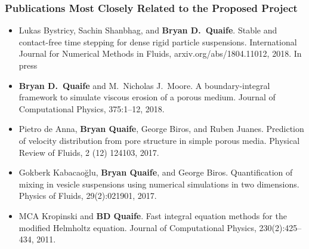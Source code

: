 \documentclass[11pt]{article}
\begin{document}
\subsubsection{Publications Most Closely Related to the Proposed
Project}
\begin{itemize}[noitemsep,topsep=0pt,parsep=0pt,partopsep=0pt] 
  \item Lukas Bystricy, Sachin Shanbhag, and {\bf Bryan D.~Quaife}.
    Stable and contact-free time stepping for dense rigid particle
    suspensions.  International Journal for Numerical Methods in Fluids,
    arxiv.org/abs/1804.11012, 2018.  In press

\item {\bf Bryan D.~Quaife} and M.~Nicholas J.~Moore.  A
  boundary-integral framework to simulate viscous erosion of a porous
  medium.  Journal of Computational Physics, 375:1--12, 2018.

\item Pietro de Anna, {\bf Bryan Quaife}, George Biros, and Ruben
  Juanes.  Prediction of velocity distribution from pore structure in
  simple porous media. Physical Review of Fluids, 2 (12) 124103, 2017.

\item Gokberk Kabacao\u{g}lu, {\bf Bryan Quaife}, and George Biros.
  Quantification of mixing in vesicle suspensions using numerical
  simulations in two dimensions.  Physics of Fluids, 29(2):021901, 2017.

\item MCA Kropinski and {\bf BD Quaife}. Fast integral equation methods
  for the modified Helmholtz equation. Journal of Computational Physics,
    230(2):425--434, 2011.

\end{itemize}

\end{document}
